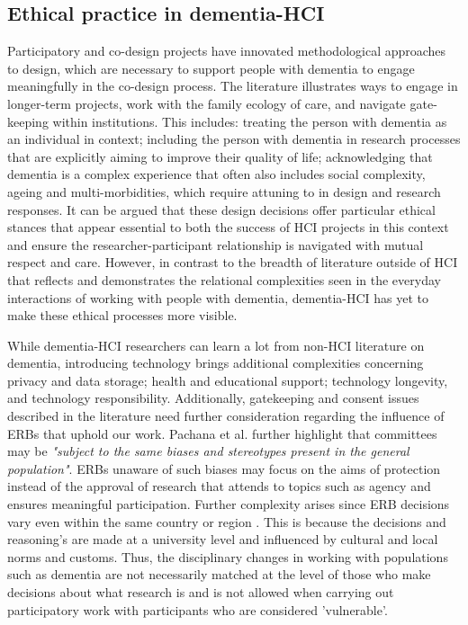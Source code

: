 \subsection{Ethical practice in dementia-HCI}
\label{BL:gap:Ethics}
Participatory and co-design projects have innovated methodological approaches to design, which are necessary to support people with dementia to engage meaningfully in the co-design process. The literature illustrates ways to engage in longer-term projects, work with the family ecology of care, and navigate gate-keeping within institutions. This includes: treating the person with dementia as an individual in context; including the person with dementia in research processes that are explicitly aiming to improve their quality of life; acknowledging that dementia is a complex experience that often also includes social complexity, ageing and multi-morbidities, which require attuning to in design and research responses. It can be argued that these design decisions offer particular ethical stances that appear essential to both the success of HCI projects in this context and ensure the researcher-participant relationship is navigated with mutual respect and care. However, in contrast to the breadth of literature outside of HCI that reflects and demonstrates the relational complexities seen in the everyday interactions of working with people with dementia, dementia-HCI has yet to make these ethical processes more visible.

While dementia-HCI researchers can learn a lot from non-HCI literature on dementia, introducing technology brings additional complexities concerning privacy and data storage; health and educational support; technology longevity, and technology responsibility. Additionally, gatekeeping and consent issues described in the literature need further consideration regarding the influence of ERBs that uphold our work. Pachana et al. further highlight that committees may be \textit{"subject to the same biases and stereotypes present in the general population"}. ERBs unaware of such biases may focus on the aims of protection instead of the approval of research that attends to topics such as agency and ensures meaningful participation. Further complexity arises since ERB decisions vary even within the same country or region \citep{edwards_research_2004}. This is because the decisions and reasoning's are made at a university level and influenced by cultural and local norms and customs. Thus, the disciplinary changes in working with populations such as dementia are not necessarily matched at the level of those who make decisions about what research is and is not allowed when carrying out participatory work with participants who are considered 'vulnerable'.

